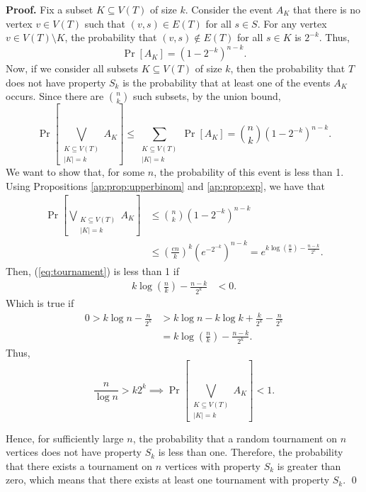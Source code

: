 \textbf{Proof. } Fix a subset $K \subseteq V(T)$ of size $k$. Consider the event $A_K$ that there is no vertex $v \in V(T)$ such that $(v, s) \in E(T)$ for all $s \in S$. For any vertex $v \in V(T) \setminus K$, the probability that $(v, s) \notin E(T)$ for all $s \in K$ is $2^{-k}$. Thus,
\[\Pr[A_K] = \left(1 - 2^{-k}\right)^{n - k}.\]
Now, if we consider all subsets $K \subseteq V(T)$ of size $k$, then the probability that $T$ does not have property $S_k$ is the probability that at least one of the events $A_K$ occurs. Since there are $\binom{n}{k}$ such subsets, by the union bound,
\[\Pr\left[\bigvee_{\substack{K \subseteq V(T) \\ |K| = k}} A_K\right] \leq \sum_{\substack{K \subseteq V(T) \\ |K| = k}}\Pr[A_K] = \binom{n}{k}\left(1 - 2^{-k}\right)^{n - k}.\]
We want to show that, for some $n$, the probability of this event is less than 1. Using Propositions \ref{ap:prop:upperbinom} and \ref{ap:prop:exp}, we have that
\begin{align}
    \Pr\left[\bigvee_{\substack{K \subseteq V(T) \\ |K| = k}} A_K\right] &\leq \binom{n}{k}\left(1 - 2^{-k}\right)^{n - k} \\
    &\leq \left(\frac{en}{k}\right)^k\left(e^{-2^{-k}}\right)^{n - k} = e^{k\log\left(\frac{n}{k}\right) - \frac{n - k}{2^k}}. \label{eq:tournament}
\end{align}
Then, (\ref{eq:tournament}) is less than 1 if
\begin{align*}
    k\log\left(\frac{n}{k}\right) - \frac{n - k}{2^k} &< 0.
\end{align*}
Which is true if 
\begin{align*}
  0 >  k\log n - \frac{n}{2^k} &> k\log n - k\log k + \frac{k}{2^k} - \frac{n}{2^k}\\
  &= k\log\left(\frac{n}{k}\right) - \frac{n - k}{2^k}.
\end{align*}
Thus,
\[\frac{n}{\log n} > k2^k \implies  \Pr\left[\bigvee_{\substack{K \subseteq V(T) \\ |K| = k}} A_K\right] < 1.\]

Hence, for sufficiently large $n$, the probability that a random tournament on $n$ vertices does not have property $S_k$ is less than one. Therefore, the probability that there exists a tournament on $n$ vertices with property $S_k$ is greater than zero, which means that there exists at least one tournament with property $S_k$. \qed

